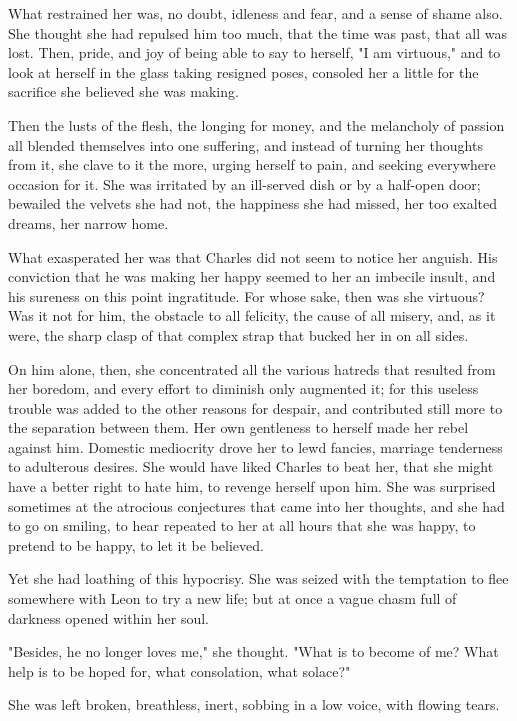 \documentclass[11pt,twocolumn]{ltugboat}
\begin{document}
What restrained her was, no doubt, idleness and fear, and a sense of
shame also. She thought she had repulsed him too much, that the time was
past, that all was lost. Then, pride, and joy of being able to say to
herself, "I am virtuous," and to look at herself in the glass taking
resigned poses, consoled her a little for the sacrifice she believed she
was making.

Then the lusts of the flesh, the longing for money, and the melancholy
of passion all blended themselves into one suffering, and instead of
turning her thoughts from it, she clave to it the more, urging herself
to pain, and seeking everywhere occasion for it. She was irritated by
an ill-served dish or by a half-open door; bewailed the velvets she had
not, the happiness she had missed, her too exalted dreams, her narrow
home.

What exasperated her was that Charles did not seem to notice her
anguish. His conviction that he was making her happy seemed to her an
imbecile insult, and his sureness on this point ingratitude. For whose
sake, then was she virtuous? Was it not for him, the obstacle to all
felicity, the cause of all misery, and, as it were, the sharp clasp of
that complex strap that bucked her in on all sides.

On him alone, then, she concentrated all the various hatreds that
resulted from her boredom, and every effort to diminish only augmented
it; for this useless trouble was added to the other reasons for despair,
and contributed still more to the separation between them. Her own
gentleness to herself made her rebel against him. Domestic mediocrity
drove her to lewd fancies, marriage tenderness to adulterous desires.
She would have liked Charles to beat her, that she might have a better
right to hate him, to revenge herself upon him. She was surprised
sometimes at the atrocious conjectures that came into her thoughts, and
she had to go on smiling, to hear repeated to her at all hours that she
was happy, to pretend to be happy, to let it be believed.

Yet she had loathing of this hypocrisy. She was seized with the
temptation to flee somewhere with Leon to try a new life; but at once a
vague chasm full of darkness opened within her soul.

"Besides, he no longer loves me," she thought. "What is to become of me?
What help is to be hoped for, what consolation, what solace?"

She was left broken, breathless, inert, sobbing in a low voice, with
flowing tears.
\end{document}
